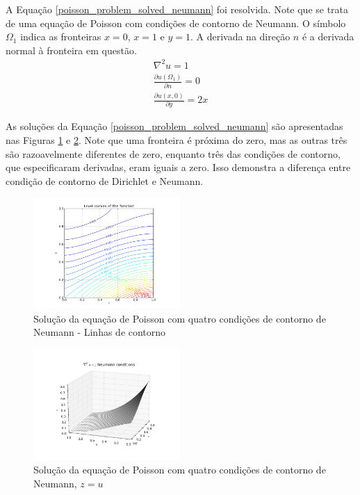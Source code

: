 \documentclass[journal]{IEEEtran}
\begin{document}
A Equação \ref{poisson_problem_solved_neumann} foi resolvida. Note que se trata de uma equação de Poisson com condições de contorno de Neumann. O símbolo $\Omega_1$ indica as fronteiras $x=0$, $x=1$ e $y=1$. A derivada na direção $n$ é a derivada normal à fronteira em questão.
\begin{eqnarray}
\nabla^2 u = 1 \label{poisson_problem_solved_neumann}\\
\frac{\partial u(\Omega_1)}{\partial n}=0\\
\frac{\partial u(x,0)}{\partial y}=2x
\end{eqnarray}

As soluções da Equação \ref{poisson_problem_solved_neumann} são apresentadas nas Figuras \ref{poisson_neumann_contorno} e \ref{poisson_neumann}. Note que uma fronteira é próxima do zero, mas as outras três são razoavelmente diferentes de zero, enquanto três das condições de contorno, que especificaram derivadas, eram iguais a zero. Isso demonstra a diferença entre condição de contorno de Dirichlet e Neumann.
\begin{figure}[ht!]
\centering
\includegraphics[width = 0.5\textwidth]{figures/poisson_neumann_04.png}
\caption{Solução da equação de Poisson com quatro condições de contorno de Neumann - Linhas de contorno\label{poisson_neumann_contorno}}
\end{figure}

\begin{figure}[ht!]
\centering
\includegraphics[width = 0.5\textwidth]{figures/poisson_neumann_03.png}
\caption{Solução da equação de Poisson com quatro condições de contorno de Neumann, $z=u$\label{poisson_neumann}}
\end{figure}
\end{document}

